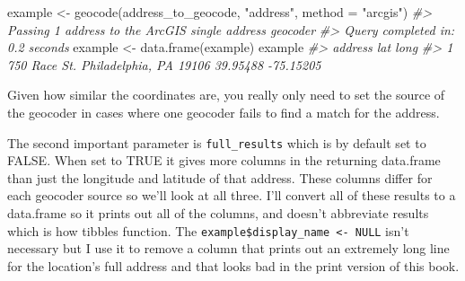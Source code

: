 \documentclass[
]{krantz}
\makeatletter
\newenvironment{Shaded}{\begin{snugshade}}{\end{snugshade}}
\newcommand{\AttributeTok}[1]{\textcolor[rgb]{0.61,0.61,0.61}{#1}}
\newcommand{\CommentTok}[1]{\textcolor[rgb]{0.37,0.37,0.37}{\textit{#1}}}
\newcommand{\FunctionTok}[1]{\textcolor[rgb]{0,0,0}{#1}}
\newcommand{\NormalTok}[1]{#1}
\newcommand{\OtherTok}[1]{\textcolor[rgb]{0.37,0.37,0.37}{#1}}
\newcommand{\StringTok}[1]{\textcolor[rgb]{0.5,0.5,0.5}{#1}}
\newenvironment{kframe}{%
\medskip{}
\setlength{\fboxsep}{.8em}
 \def\at@end@of@kframe{}%
 \ifinner\ifhmode%
  \def\at@end@of@kframe{\end{minipage}}%
  \begin{minipage}{\columnwidth}%
 \fi\fi%
 \def\FrameCommand##1{\hskip\@totalleftmargin \hskip-\fboxsep
 \colorbox{shadecolor}{##1}\hskip-\fboxsep
     \hskip-\linewidth \hskip-\@totalleftmargin \hskip\columnwidth}%
 \MakeFramed {\advance\hsize-\width
   \@totalleftmargin\z@ \linewidth\hsize
   \@setminipage}}%
 {\par\unskip\endMakeFramed%
 \at@end@of@kframe}
\renewenvironment{Shaded}{\begin{kframe}}{\end{kframe}}
\makeatother
\begin{document}
\begin{Shaded}
\begin{Highlighting}[]
\NormalTok{example }\OtherTok{\textless{}{-}} \FunctionTok{geocode}\NormalTok{(address\_to\_geocode, }\StringTok{"address"}\NormalTok{, }\AttributeTok{method =} \StringTok{"arcgis"}\NormalTok{)}
\CommentTok{\#\textgreater{} Passing 1 address to the ArcGIS single address geocoder}
\CommentTok{\#\textgreater{} Query completed in: 0.2 seconds}
\NormalTok{example }\OtherTok{\textless{}{-}} \FunctionTok{data.frame}\NormalTok{(example)}
\NormalTok{example}
\CommentTok{\#\textgreater{}                               address      lat      long}
\CommentTok{\#\textgreater{} 1 750 Race St. Philadelphia, PA 19106 39.95488 {-}75.15205}
\end{Highlighting}
\end{Shaded}

Given how similar the coordinates are, you really only need
to set the source of the geocoder in cases where one
geocoder fails to find a match for the address.

The second important parameter is \texttt{full\_results}
which is by default set to FALSE. When set to TRUE it gives
more columns in the returning data.frame than just the
longitude and latitude of that address. These columns differ
for each geocoder source so we'll look at all three. I'll
convert all of these results to a data.frame so it prints
out all of the columns, and doesn't abbreviate results which
is how tibbles function. The
\texttt{example\$display\_name\ \textless{}-\ NULL} isn't
necessary but I use it to remove a column that prints out an
extremely long line for the location's full address and that
looks bad in the print version of this book.
\end{document}
